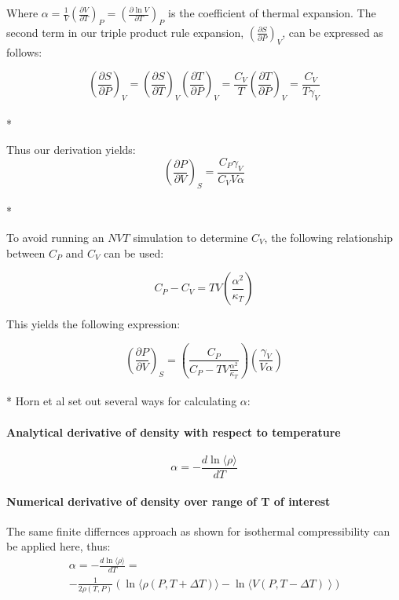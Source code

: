 \documentclass[9pt,bestpractices]{livecoms}
\begin{document}
Where $\alpha = \frac{1}{V} \left(\frac{\partial V}{\partial T}\right)_{P} = \left(\frac{\partial \ln V}{\partial T}\right)_{P}$ is the coefficient of thermal expansion. The second term in our triple product rule expansion, $\left(\frac{\partial S}{\partial P}\right)_{V}$, can be expressed as follows:

\begin{equation}\left(\frac{\partial S}{\partial P}\right)_{V} = \left(\frac{\partial S}{\partial T}\right)_{V} \left(\frac{\partial T}{\partial P}\right)_{V} = \frac{C_V}{T} \left(\frac{\partial T}{\partial P}\right)_{V} = \frac{C_V}{T \gamma_V}\end{equation}\\* 

Thus our derivation yields:
\begin{equation}\left(\frac{\partial P}{\partial V}\right)_{S} = \frac{C_P \gamma_V}{C_V V \alpha}\end{equation}\\*

To avoid running an $NVT$ simulation to determine $C_V$, the following relationship between $C_P$ and $C_V$ can be used:

\begin{equation} C_P-C_V = TV\left(\frac{\alpha^2}{\kappa_T}\right)\end{equation}

This yields the following expression:

\begin{equation}\left(\frac{\partial P}{\partial V}\right)_{S} = \left(\frac{C_P}{C_P -TV\frac{\alpha^2}{\kappa_T}}\right)\left(\frac{\gamma_V}{V\alpha}\right)\end{equation}\\*
Horn et al set out several ways for calculating $\alpha$\cite{horn}:

\paragraph{Analytical derivative of density with respect to temperature}
\begin{equation}\alpha = -\frac{d\ln\langle \rho \rangle}{dT}\end{equation}

\paragraph{Numerical derivative of density over range of T of interest}
The same finite differnces approach as shown for isothermal compressibility can be applied here, thus:
\begin{multline}
\alpha = -\frac{d\ln\langle \rho \rangle}{dT} = \\ -\frac{1}{2\rho(T,P)} \left(\ln \langle \rho(P,T+\Delta T)\rangle - \ln \langle V(P,T-\Delta T)\right\rangle)\end{multline}
\end{document}
